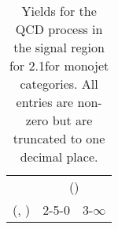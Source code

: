 \begin{table}[h!]
\tiny
\centering
\caption{Yields for the QCD process in the signal region for 2.1\ifb for monojet categories. All entries are non-zero but are truncated to one decimal place.\label{tab:yieldssep_sig_qcd_mono}}
\begin{tabular}
{ccc}
	\hline\hline
	& \multicolumn{2}{c}{\scalht (\gev)} \\ 
	 (\njet,  \nb) & 2-5-0 & 3-$\infty$ \\ [0.8ex] 
\hline
	\hline
	\hline
\end{tabular}
\end{table}
